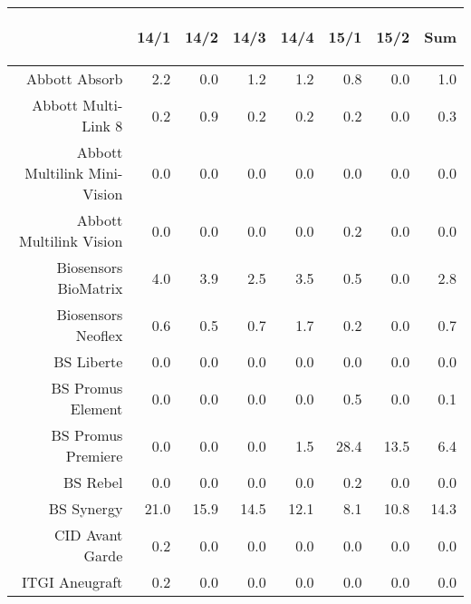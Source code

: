 \documentclass[presentation,xcolor=pdftex,dvipsnames,table]{beamer}
\begin{document}
\begin{frame}
\begin{tiny}
\begin{table}[ht]
\centering
\begin{tabular}{rrrrrrrr}
  \toprule
 & \begin{sideways} 14/1 \end{sideways} & \begin{sideways} 14/2 \end{sideways} & \begin{sideways} 14/3 \end{sideways} & \begin{sideways} 14/4 \end{sideways} & \begin{sideways} 15/1 \end{sideways} & \begin{sideways} 15/2 \end{sideways} & \begin{sideways} Sum \end{sideways} \\ 
  \midrule
Abbott Absorb & 2.2 & 0.0 & 1.2 & 1.2 & 0.8 & 0.0 & 1.0 \\ 
  Abbott Multi-Link 8 & 0.2 & 0.9 & 0.2 & 0.2 & 0.2 & 0.0 & 0.3 \\ 
  Abbott Multilink Mini-Vision & 0.0 & 0.0 & 0.0 & 0.0 & 0.0 & 0.0 & 0.0 \\ 
  Abbott Multilink Vision & 0.0 & 0.0 & 0.0 & 0.0 & 0.2 & 0.0 & 0.0 \\ 
  Biosensors BioMatrix & 4.0 & 3.9 & 2.5 & 3.5 & 0.5 & 0.0 & 2.8 \\ 
  Biosensors Neoflex & 0.6 & 0.5 & 0.7 & 1.7 & 0.2 & 0.0 & 0.7 \\ 
  BS Liberte & 0.0 & 0.0 & 0.0 & 0.0 & 0.0 & 0.0 & 0.0 \\ 
  BS Promus Element & 0.0 & 0.0 & 0.0 & 0.0 & 0.5 & 0.0 & 0.1 \\ 
  BS Promus Premiere & 0.0 & 0.0 & 0.0 & 1.5 & 28.4 & 13.5 & 6.4 \\ 
  BS Rebel & 0.0 & 0.0 & 0.0 & 0.0 & 0.2 & 0.0 & 0.0 \\ 
  BS Synergy & 21.0 & 15.9 & 14.5 & 12.1 & 8.1 & 10.8 & 14.3 \\ 
  CID Avant Garde & 0.2 & 0.0 & 0.0 & 0.0 & 0.0 & 0.0 & 0.0 \\ 
  ITGI Aneugraft & 0.2 & 0.0 & 0.0 & 0.0 & 0.0 & 0.0 & 0.0 \\ 

\end{tabular}
\end{table}
\end{tiny}
\end{frame}
\end{document}
